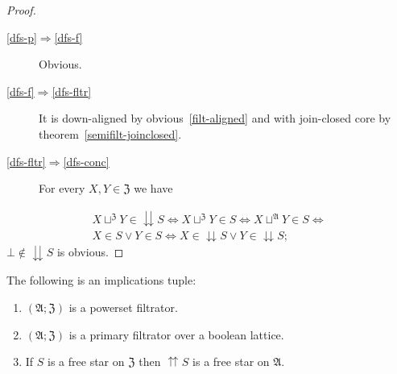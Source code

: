 \begin{proof}
~
\begin{description}
\item [{\ref{dfs-p}$\Rightarrow$\ref{dfs-f}}] Obvious.
\item [{\ref{dfs-f}$\Rightarrow$\ref{dfs-fltr}}] It is down-aligned
by obvious~\ref{filt-aligned} and with join-closed core by theorem~\ref{semifilt-joinclosed}.
\item [{\ref{dfs-fltr}$\Rightarrow$\ref{dfs-conc}}] For every $X,Y\in\mathfrak{Z}$
we have
\end{description}
\begin{multline*}
X\sqcup^{\mathfrak{Z}}Y\in\downdownarrows S\Leftrightarrow X\sqcup^{\mathfrak{Z}}Y\in S\Leftrightarrow X\sqcup^{\mathfrak{A}}Y\in S\Leftrightarrow\\
X\in S\vee Y\in S\Leftrightarrow X\in\downdownarrows S\vee Y\in\downdownarrows S;
\end{multline*}
 $\bot\notin\downdownarrows S$ is obvious.

\end{proof}
\begin{prop}
The following is an implications tuple:
\begin{enumerate}
\item \label{ufs-p}$(\mathfrak{A};\mathfrak{Z})$ is a powerset filtrator.
\item \label{ufs-filt}$(\mathfrak{A};\mathfrak{Z})$ is a primary filtrator
over a boolean lattice.
\item \label{ufs-conc}If $S$ is a free star on $\mathfrak{Z}$ then $\upuparrows S$
is a free star on $\mathfrak{A}$.
\end{enumerate}
\end{prop}
